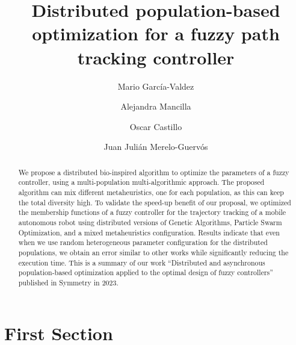 \documentclass[runningheads]{llncs}
\begin{document}
%
\title{ Distributed population-based optimization for a fuzzy path tracking controller}
%
%
\author{Mario García-Valdez \and
Alejandra Mancilla \and
Oscar Castillo \and 
Juan Julián Merelo-Guervós}
%
%
%
\maketitle              %
%
\begin{abstract}
    We propose a distributed bio-inspired algorithm to
	optimize the parameters of a fuzzy controller, using a multi-population
	multi-algorithmic approach. The proposed algorithm can mix different metaheuristics, one for each
	population, as this can keep the total diversity high. To validate the speed-up
    benefit of our proposal, we optimized the membership functions of a fuzzy controller
	for the trajectory tracking of a mobile autonomous robot using
	distributed versions of Genetic Algorithms, Particle Swarm
	Optimization, and a mixed metaheuristics configuration. 
    Results indicate that even
	when we use random heterogeneous parameter configuration for the
	distributed populations, we obtain an error similar to other works 
	while significantly reducing the execution time. This is a summary of our work
    ``Distributed and asynchronous population-based optimization applied to the optimal
    design of fuzzy controllers'' published in Symmetry in 2023. 

\end{abstract}
%
%
%
\section{First Section}
\end{document}
